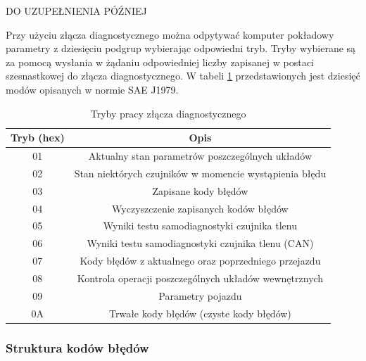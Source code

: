 \documentclass[12pt]{article} %
\numberwithin{equation}{subsection}
\numberwithin{figure}{section}
\numberwithin{table}{section}
\begin{document}
		DO UZUPEŁNIENIA PÓŹNIEJ
		
		\hspace{0.5cm}Przy użyciu złącza diagnostycznego można odpytywać komputer pokładowy parametry z dziesięciu podgrup wybierając odpowiedni tryb. Tryby wybierane są za pomocą wysłania w żądaniu odpowiedniej liczby zapisanej w postaci szesnastkowej do złącza diagnostycznego. W tabeli \ref{tab_pid_modes} przedstawionych jest dziesięć modów opisanych w normie SAE J1979.
		
		\begin{table}[ht]
\centering
\caption{Tryby pracy złącza diagnostycznego}
\label{tab_pid_modes}
\begin{tabular}{|c|c|}
\hline
\textbf{Tryb (hex)} & \textbf{Opis}                                                               \\ \hline
01                  & Aktualny stan parametrów poszczególnych układów                             \\ \hline
02                  & Stan niektórych czujników w momencie wystąpienia błędu                      \\ \hline
03                  & Zapisane kody błędów                                                        \\ \hline
04                  & Wyczyszczenie zapisanych kodów błędów            \\ \hline
05                  & Wyniki testu samodiagnostyki czujnika tlenu \\ \hline
06                  & Wyniki testu samodiagnostyki czujnika tlenu (CAN)                             \\ \hline
07                  & Kody błędów z aktualnego oraz poprzedniego przejazdu         \\ \hline
08                  & Kontrola operacji poszczególnych układów wewnętrznych                       \\ \hline
09                  & Parametry pojazdu                                                           \\ \hline
0A                  & Trwałe kody błędów (czyste kody błędów)                                     \\ \hline
\end{tabular}
\end{table}
		
		
		\newpage
		
		\subsubsection{Struktura kodów błędów}
		
\end{document}
